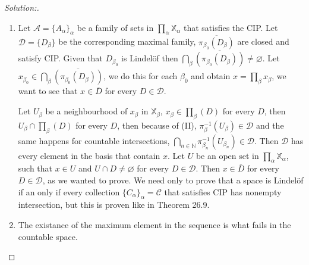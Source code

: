\documentclass[a4paper,12pt, reqno]{article}
\theoremstyle{definition}
\newenvironment{solution}{\begin{proof}[Solution:]}{\end{proof}}
\newcommand{\A}{\mathscr{A}}
\newcommand{\D}{\mathscr{D}}
\newcommand{\C}{\mathscr{C}}
\newcommand{\N}{\mathbb{N}}
\newcommand{\X}{\mathbb{X}}
\begin{document}
\begin{solution}\hfill
  \begin{enumerate}[label=(\alph*)]
    \item Let $\A = \{ A_{\alpha} \}_{\alpha}$ be a family of sets in $\prod_{\alpha}\X_{\alpha}$ that satisfies the CIP. Let $\D = \{ D_{\beta} \}$ be the corresponding maximal family, $\overline{\pi_{\beta_{0}}(D_{\beta})}$ are closed and satisfy CIP.
    Given that $D_{\beta_{0}}$ is Lindelöf then $\bigcap_{\beta}\overline{(\pi_{\beta_{0}}(D_{\beta}))}\neq \varnothing$. Let $x_{\beta_{0}}\in\bigcap_{\beta}\overline{(\pi_{\beta_{0}}(D_{\beta}))}$, we do this for each $\beta_{0}$ and obtain $x = \prod_{\beta}x_{\beta}$, we want to see that $x\in \overline{D}$ for every $D\in\D$.

    Let $U_{\beta}$ be a neighbourhood of $x_{\beta}$ in $\X_{\beta}$, $x_{\beta}\in\prod_{\beta}(D)$ for every $D$, then $U_{\beta}\cap\prod_{\beta}(D)$ for every $D$, then because of (II), $\pi_{\beta}^{-1}(U_{\beta})\in\D$ and the same happens for countable intersections, $\bigcap_{n\in\N}\pi_{\beta_{n}}^{-1}(U_{\beta_{n}})\in\D$. Then $\D$ has every element in the basis that contain $x$. Let $U$ be an open set in $\prod_{\alpha}\X_{\alpha}$, such that $x\in U$ and $U\cap D\neq \varnothing$ for every $D\in\D$. Then $x\in \overline{D}$ for every $D\in\D$, as we wanted to prove. We need only to prove that a space is Lindelöf if an only if every collection $\{ C_{\alpha} \}_{\alpha} = \C$ that satisfies CIP has nonempty intersection, but this is proven like in Theorem 26.9.

    \item The existance of the maximum element in the sequence is what fails in the countable space.
  \end{enumerate}
\end{solution}
\end{document}
